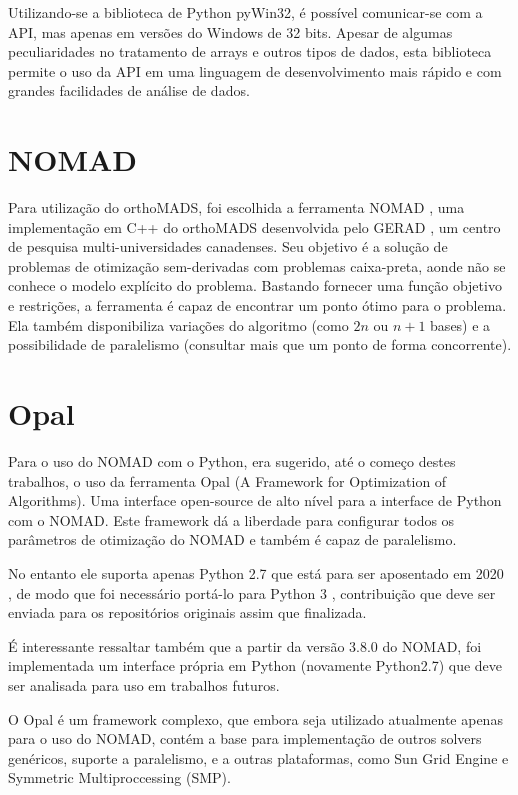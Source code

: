  Utilizando-se a biblioteca de Python pyWin32, é possível comunicar-se com a API, mas apenas em versões do Windows de 32 bits. Apesar de algumas peculiaridades no tratamento de arrays e outros tipos de dados, esta biblioteca permite o uso da API em uma linguagem de desenvolvimento mais rápido\cite{pythonfast} e com grandes facilidades de análise de dados.

\section{NOMAD}
Para utilização do orthoMADS, foi escolhida a ferramenta NOMAD \cite{Nomad}, uma implementação em C++ do orthoMADS desenvolvida pelo GERAD \cite{gerad}, um centro de pesquisa multi-universidades canadenses.
%
Seu objetivo é a solução de problemas de otimização sem-derivadas com problemas caixa-preta, aonde não se conhece o modelo explícito do problema.
%
Bastando fornecer uma função objetivo e restrições, a ferramenta é capaz de encontrar um ponto ótimo para o problema.
Ela também disponibiliza variações do algoritmo (como $2n$ ou $n+1$ bases) e a possibilidade de paralelismo (consultar mais que um ponto de forma concorrente).  

	

\section{Opal}
Para o uso do NOMAD com o Python, era sugerido, até o começo destes trabalhos, o uso da ferramenta Opal \cite{opal} (A Framework for Optimization of Algorithms). Uma interface open-source de alto nível para a interface de Python com o NOMAD. Este framework dá a liberdade para configurar todos os parâmetros de otimização do NOMAD e também é capaz de paralelismo.

No entanto ele suporta apenas Python 2.7 que está para ser aposentado em 2020 \cite{python27sched}, de modo que foi necessário portá-lo para Python 3 \cite{opalPython3}, contribuição que deve ser enviada para os repositórios originais assim que finalizada.

É interessante ressaltar também que a partir da versão 3.8.0 do NOMAD, foi implementada um interface própria em Python (novamente Python2.7) que deve ser analisada para uso em trabalhos futuros.

O Opal é um framework complexo, que embora seja utilizado atualmente apenas para o uso do NOMAD, contém a base para implementação de outros solvers genéricos, suporte a paralelismo, e a outras plataformas, como Sun Grid Engine e Symmetric Multiproccessing (SMP).


